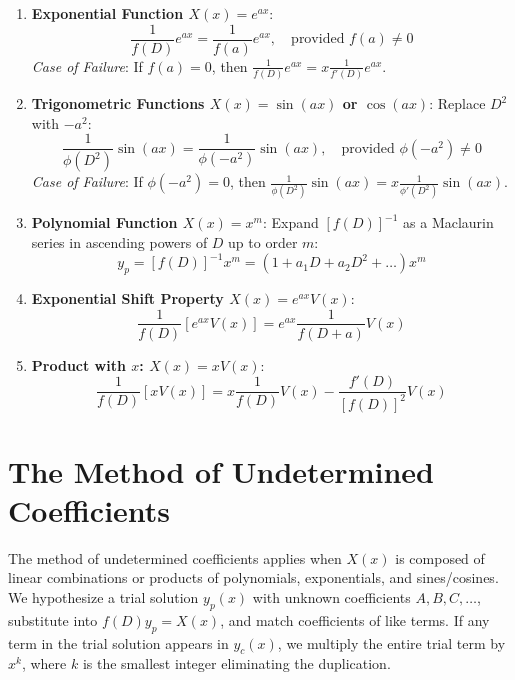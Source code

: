\begin{theorem}
\begin{enumerate}
    \item \textbf{Exponential Function $X(x) = e^{ax}$}:
    \begin{equation}
    \frac{1}{f(D)} e^{ax} = \frac{1}{f(a)} e^{ax}, \quad \text{provided } f(a) \neq 0
    \end{equation}
    \textit{Case of Failure}: If $f(a) = 0$, then $\frac{1}{f(D)} e^{ax} = x \frac{1}{f'(D)} e^{ax}$.
    \item \textbf{Trigonometric Functions $X(x) = \sin(ax)$ or $\cos(ax)$}:
    Replace $D^2$ with $-a^2$:
    \begin{equation}
    \frac{1}{\phi(D^2)} \sin(ax) = \frac{1}{\phi(-a^2)} \sin(ax), \quad \text{provided } \phi(-a^2) \neq 0
    \end{equation}
    \textit{Case of Failure}: If $\phi(-a^2) = 0$, then $\frac{1}{\phi(D^2)} \sin(ax) = x \frac{1}{\phi'(D^2)} \sin(ax)$.
    \item \textbf{Polynomial Function $X(x) = x^m$}:
    Expand $[f(D)]^{-1}$ as a Maclaurin series in ascending powers of $D$ up to order $m$:
    \begin{equation}
    y_p = [f(D)]^{-1} x^m = (1 + a_1 D + a_2 D^2 + \dots) x^m
    \end{equation}
    \item \textbf{Exponential Shift Property $X(x) = e^{ax} V(x)$}:
    \begin{equation}
    \frac{1}{f(D)} [e^{ax} V(x)] = e^{ax} \frac{1}{f(D + a)} V(x)
    \end{equation}
    \item \textbf{Product with $x$: $X(x) = x V(x)$}:
    \begin{equation}
    \frac{1}{f(D)} [x V(x)] = x \frac{1}{f(D)} V(x) - \frac{f'(D)}{[f(D)]^2} V(x)
    \end{equation}
\end{enumerate}
\end{theorem}

\section{The Method of Undetermined Coefficients}
The method of undetermined coefficients applies when $X(x)$ is composed of linear combinations or products of polynomials, exponentials, and sines/cosines. We hypothesize a trial solution $y_p(x)$ with unknown coefficients $A, B, C, \dots$, substitute into $f(D)y_p = X(x)$, and match coefficients of like terms. If any term in the trial solution appears in $y_c(x)$, we multiply the entire trial term by $x^k$, where $k$ is the smallest integer eliminating the duplication.

